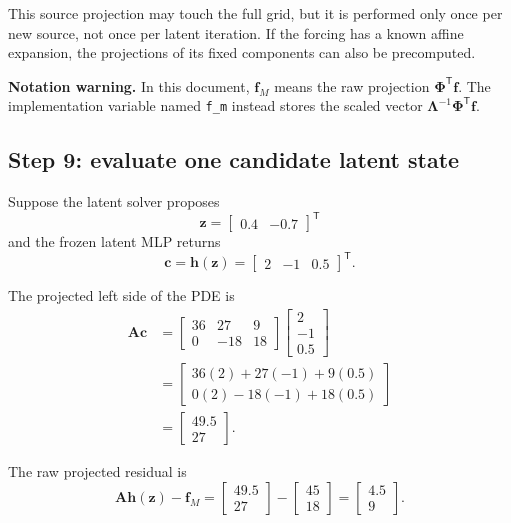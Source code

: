\documentclass[11pt]{article}
\newcommand{\mat}[1]{\mathbf{#1}}
\newcommand{\vect}[1]{\mathbf{#1}}
\begin{document}
This source projection may touch the full grid, but it is performed only once
per new source, not once per latent iteration.  If the forcing has a known
affine expansion, the projections of its fixed components can also be
precomputed.

\textbf{Notation warning.} In this document, $\vect{f}_M$ means the raw
projection $\mat{\Phi}^{\mathsf T}\vect{f}$.  The implementation variable
named \texttt{f\_m} instead stores the scaled vector
$\mat{\Lambda}^{-1}\mat{\Phi}^{\mathsf T}\vect{f}$.

\subsection{Step 9: evaluate one candidate latent state}

Suppose the latent solver proposes
\begin{equation}
  \vect{z}=\begin{bmatrix}0.4&-0.7\end{bmatrix}^{\mathsf T}
\end{equation}
and the frozen latent MLP returns
\begin{equation}
  \vect{c}=\vect{h}(\vect{z})
  =\begin{bmatrix}2&-1&0.5\end{bmatrix}^{\mathsf T}.
\end{equation}

The projected left side of the PDE is
\begin{align}
  \mat{A}\vect{c}
  &=\begin{bmatrix}
      36&27&9\\0&-18&18
    \end{bmatrix}
    \begin{bmatrix}2\\-1\\0.5\end{bmatrix}\\
  &=\begin{bmatrix}
      36(2)+27(-1)+9(0.5)\\
      0(2)-18(-1)+18(0.5)
    \end{bmatrix}\\
  &=\begin{bmatrix}49.5\\27\end{bmatrix}.
\end{align}

The raw projected residual is
\begin{equation}
  \mat{A}\vect{h}(\vect{z})-\vect{f}_M
  =\begin{bmatrix}49.5\\27\end{bmatrix}
   -\begin{bmatrix}45\\18\end{bmatrix}
  =\begin{bmatrix}4.5\\9\end{bmatrix}.
\end{equation}
\end{document}
